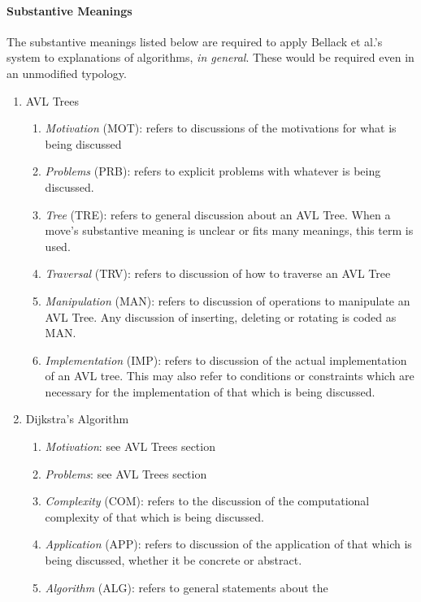 \documentclass[conference]{IEEEtran}
\begin{document}
\paragraph{Substantive Meanings}
The substantive meanings listed below are required to apply Bellack et al.'s
system to explanations of algorithms, \emph{in general}. These would be required
even in an unmodified typology.
\begin{enumerate}
  \item{AVL Trees}
    \begin{enumerate}
      \item \emph{Motivation} (MOT): refers to discussions of the motivations
        for what is being discussed
      \item \emph{Problems} (PRB): refers to explicit problems with whatever is
        being discussed.
      \item \emph{Tree} (TRE): refers to general discussion about an AVL
        Tree. When a move's substantive meaning is unclear or fits many
        meanings, this term is used.
      \item \emph{Traversal} (TRV): refers to discussion of how to traverse
        an AVL Tree
      \item \emph{Manipulation} (MAN): refers to discussion of operations to
        manipulate an AVL Tree. Any discussion of inserting, deleting or
        rotating is coded as MAN.
      \item \emph{Implementation} (IMP): refers to discussion of the actual
        implementation of an AVL tree. This may also refer to conditions or
        constraints which are necessary for the implementation of that which
        is being discussed.
    \end{enumerate}
  \item{Dijkstra's Algorithm}
    \begin{enumerate}
      \item \emph{Motivation}: see AVL Trees section
      \item \emph{Problems}: see AVL Trees section
      \item \emph{Complexity} (COM): refers to the discussion of the computational
        complexity of that which is being discussed. 
      \item \emph{Application} (APP): refers to discussion of the application of
        that which is being discussed, whether it be concrete or abstract.
      \item \emph{Algorithm} (ALG): refers to general statements about the

\end{enumerate}
\end{enumerate}
\end{document}
